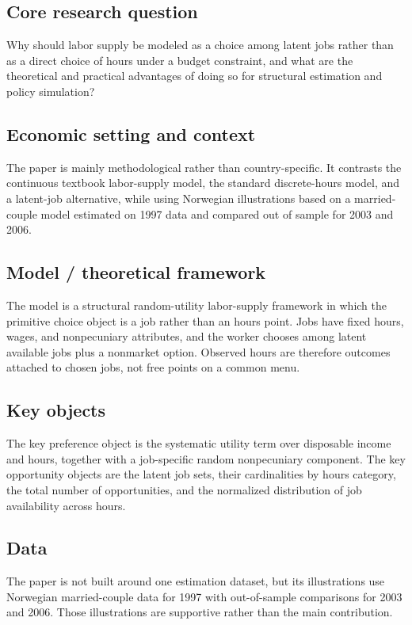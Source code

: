 \documentclass[11pt,a4paper]{article}
\begin{document}
\subsection*{Core research question}
Why should labor supply be modeled as a choice among latent jobs rather than as a direct choice of hours under a budget constraint, and what are the theoretical and practical advantages of doing so for structural estimation and policy simulation?

\subsection*{Economic setting and context}
The paper is mainly methodological rather than country-specific. It contrasts the continuous textbook labor-supply model, the standard discrete-hours model, and a latent-job alternative, while using Norwegian illustrations based on a married-couple model estimated on 1997 data and compared out of sample for 2003 and 2006.

\subsection*{Model / theoretical framework}
The model is a structural random-utility labor-supply framework in which the primitive choice object is a job rather than an hours point. Jobs have fixed hours, wages, and nonpecuniary attributes, and the worker chooses among latent available jobs plus a nonmarket option. Observed hours are therefore outcomes attached to chosen jobs, not free points on a common menu.

\subsection*{Key objects}
The key preference object is the systematic utility term over disposable income and hours, together with a job-specific random nonpecuniary component. The key opportunity objects are the latent job sets, their cardinalities by hours category, the total number of opportunities, and the normalized distribution of job availability across hours.

\subsection*{Data}
The paper is not built around one estimation dataset, but its illustrations use Norwegian married-couple data for 1997 with out-of-sample comparisons for 2003 and 2006. Those illustrations are supportive rather than the main contribution.
\end{document}
